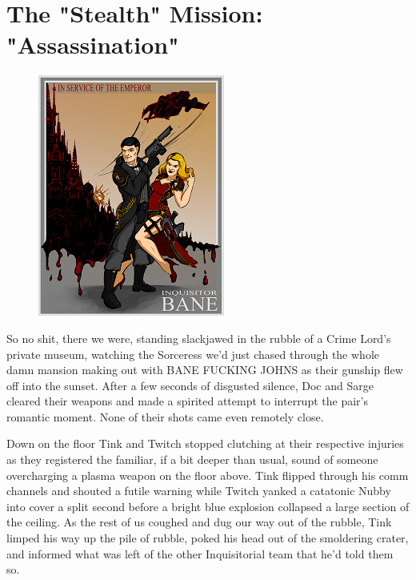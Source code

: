 \chapter{The "Stealth" Mission: "Assassination"}

\begin{figure}
	\begin{center}
		\includegraphics[width=\figwidth]{pics/19/1.png}
	\end{center}
\end{figure}
So no shit, there we were, standing slackjawed in the rubble of a Crime Lord's private museum, watching the Sorceress we'd just chased through the whole damn mansion making out with BANE FUCKING JOHNS as their gunship flew off into the sunset. 
After a few seconds of disgusted silence, Doc and Sarge cleared their weapons and made a spirited attempt to interrupt the pair's romantic moment. 
None of their shots came even remotely close. 


Down on the floor Tink and Twitch stopped clutching at their respective injuries as they registered the familiar, if a bit deeper than usual, sound of someone overcharging a plasma weapon on the floor above. 
Tink flipped through his comm channels and shouted a futile warning while Twitch yanked a catatonic Nubby into cover a split second before a bright blue explosion collapsed a large section of the ceiling. 
As the rest of us coughed and dug our way out of the rubble, Tink limped his way up the pile of rubble, poked his head out of the smoldering crater, and informed what was left of the other Inquisitorial team that he'd told them so.





